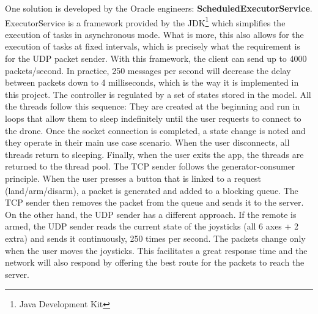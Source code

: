 \documentclass{IEEEtran}
\begin{document}
\newline
\newline
One solution is developed by the Oracle engineers: \textbf{ScheduledExecutorService}. ExecutorService is a framework provided by the JDK\footnote{Java Development Kit} which simplifies the execution of tasks in asynchronous mode. What is more, this also allows for the execution of tasks at fixed intervals, which is precisely what the requirement is for the UDP packet sender. With this framework, the client can send up to 4000 packets/second. In practice, 250 messages per second will decrease the delay between packets down to 4 milliseconds, which is the way it is implemented in this project. 
\newline
\newline
The controller is regulated by a set of states stored in the model. All the threads follow this sequence: They are created at the beginning and run in loops that allow them to sleep indefinitely until the user requests to connect to the drone. Once the socket connection is completed, a state change is noted and they operate in their main use case scenario. When the user disconnects, all threads return to sleeping. Finally, when the user exits the app, the threads are returned to the thread pool.
\newline
\newline
The TCP sender follows the generator-consumer principle. When the user presses a button that is linked to a request (land/arm/disarm), a packet is generated and added to a blocking queue. The TCP sender then removes the packet from the queue and sends it to the server.
\newline
\newline
On the other hand, the UDP sender has a different approach. If the remote is armed, the UDP sender reads the current state of the joysticks (all 6 axes + 2 extra) and sends it continuously, 250 times per second. The packets change only when the user moves the joysticks. This facilitates a great response time and the network will also respond by offering the best route for the packets to reach the server.
\end{document}
